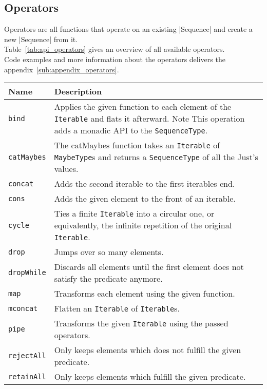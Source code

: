 \subsection{Operators} %
\label{sub:api_Operators}
Operators are all functions that operate on an existing |Sequence| and create a
new |Sequence| from it. \\
Table~\ref{tab:api_operators} gives an overview of all available operators.\\
Code examples and more information about the operators delivers the
appendix~\ref{sub:appendix_operators}.
\begin{table}[H]
  \centering
  \begin{tabularx}{\textwidth}{| l | X |} \hline
    \textbf{Name} & \textbf{Description} \\ \hline
    \texttt{bind} & Applies the given function to each element of the \texttt{Iterable} and flats it afterward. Note This operation adds a monadic API to the \texttt{SequenceType}. \\ \hline 
    \texttt{catMaybes} & The catMaybes function takes an \texttt{Iterable} of \texttt{MaybeType}s and returns a \texttt{SequenceType} of all the Just's values. \\ \hline 
    \texttt{concat} & Adds the second iterable to the first iterables end. \\ \hline 
    \texttt{cons} & Adds the given element to the front of an iterable. \\ \hline 
    \texttt{cycle} & Ties a finite \texttt{Iterable} into a circular one, or equivalently, the infinite repetition of the original \texttt{Iterable}. \\ \hline 
    \texttt{drop} & Jumps over so many elements. \\ \hline 
    \texttt{dropWhile} & Discards all elements until the first element does not satisfy the predicate anymore. \\ \hline 
    \texttt{map} & Transforms each element using the given function. \\ \hline 
    \texttt{mconcat} & Flatten an \texttt{Iterable} of \texttt{Iterable}s. \\ \hline 
    \texttt{pipe} & Transforms the given \texttt{Iterable} using the passed operators. \\ \hline 
    \texttt{rejectAll} & Only keeps elements which does not fulfill the given predicate. \\ \hline 
    \texttt{retainAll} & Only keeps elements which fulfill the given predicate. \\ \hline 

\end{tabularx}
\end{table}
